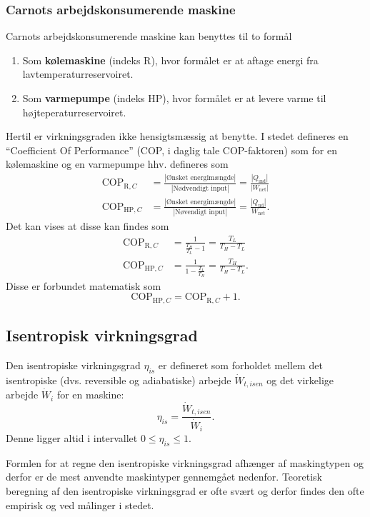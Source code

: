 \subsubsection{Carnots arbejdskonsumerende maskine}
Carnots arbejdskonsumerende maskine kan benyttes til to formål
\begin{enumerate}
  \item Som \textbf{kølemaskine} (indeks $\mathrm{R}$), hvor formålet er at aftage energi fra lavtemperaturreservoiret.
  \item Som \textbf{varmepumpe} (indeks $\mathrm{HP}$), hvor formålet er at levere varme til højteperaturreservoiret.
\end{enumerate}
Hertil er virkningsgraden ikke hensigtsmæssig at benytte. I stedet defineres en ``Coefficient Of Performance'' (COP, i daglig tale COP-faktoren) som for en kølemaskine og en varmepumpe hhv. defineres som
\begin{align*}
  \mathrm{COP}_{\mathrm{R},C} &= \frac{\left| \text{Ønsket energimængde} \right|}{\left| \text{Nødvendigt input} \right|} = \frac{\left| Q_{\mathrm{ind}} \right|}{\left| W_{\mathrm{net}} \right|} \\
  \mathrm{COP}_{\mathrm{HP}, C} &= \frac{\left| \text{Ønsket energimængde} \right|}{\left| \text{Nøvendigt input} \right|} = \frac{\left| Q_{\mathrm{ud}} \right|}{W_{\mathrm{net}}}
.\end{align*}
Det kan vises at disse kan findes som
\begin{align*}
  \mathrm{COP}_{\mathrm{R}, C} &= \frac{1}{\frac{T_H}{T_L} - 1} = \frac{T_L}{T_H - T_L} \\
  \mathrm{COP}_{\mathrm{HP}, C} &= \frac{1}{1 - \frac{T_L}{T_H}} = \frac{T_H}{T_H - T_L}
.\end{align*}
Disse er forbundet matematisk som
\[ 
\mathrm{COP}_{\mathrm{HP}, C} = \mathrm{COP}_{\mathrm{R}, C} + 1
.\]

\subsection{Isentropisk virkningsgrad}
Den isentropiske virkningsgrad $\eta_{is}$ er defineret som forholdet mellem det isentropiske (dvs. reversible og adiabatiske) arbejde $\dot{W}_{t, isen}$ og det virkelige arbejde $\dot{W}_{i}$ for en maskine:
\[ 
\eta_{is} = \frac{\dot{W}_{t, isen}}{\dot{W}_{i}}
.\]
Denne ligger altid i intervallet $0 \leq \eta_{is} \leq 1$.

Formlen for at regne den isentropiske virkningsgrad afhænger af maskingtypen og derfor er de mest anvendte maskintyper gennemgået nedenfor. Teoretisk beregning af den isentropiske virkningsgrad er ofte svært og derfor findes den ofte empirisk og ved målinger i stedet. 

